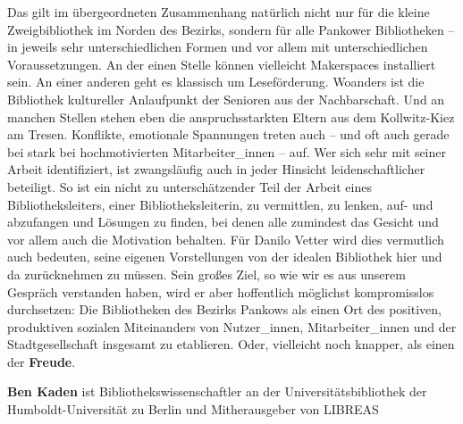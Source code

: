 \documentclass[a4paper,
fontsize=11pt,
oneside,
numbers=noperiodatend,
parskip=half-,
bibliography=totoc,
final
]{scrartcl}
\begin{document}
Das gilt im übergeordneten Zusammenhang natürlich nicht nur für die
kleine Zweigbibliothek im Norden des Bezirks, sondern für alle Pankower
Bibliotheken -- in jeweils sehr unterschiedlichen Formen und vor allem
mit unterschiedlichen Voraussetzungen. An der einen Stelle können
vielleicht Makerspaces installiert sein. An einer anderen geht es
klassisch um Leseförderung. Woanders ist die Bibliothek kultureller
Anlaufpunkt der Senioren aus der Nachbarschaft. Und an manchen Stellen
stehen eben die anspruchsstarkten Eltern aus dem Kollwitz-Kiez am
Tresen. Konflikte, emotionale Spannungen treten auch -- und oft auch
gerade bei stark bei hochmotivierten Mitarbeiter\_innen -- auf. Wer sich
sehr mit seiner Arbeit identifiziert, ist zwangsläufig auch in jeder
Hinsicht leidenschaftlicher beteiligt. So ist ein nicht zu
unterschätzender Teil der Arbeit eines Bibliotheksleiters, einer
Bibliotheksleiterin, zu vermittlen, zu lenken, auf- und abzufangen und
Lösungen zu finden, bei denen alle zumindest das Gesicht und vor allem
auch die Motivation behalten. Für Danilo Vetter wird dies vermutlich
auch bedeuten, seine eigenen Vorstellungen von der idealen Bibliothek
hier und da zurücknehmen zu müssen. Sein großes Ziel, so wie wir es aus
unserem Gespräch verstanden haben, wird er aber hoffentlich möglichst
kompromisslos durchsetzen: Die Bibliotheken des Bezirks Pankows als
einen Ort des positiven, produktiven sozialen Miteinanders von
Nutzer\_innen, Mitarbeiter\_innen und der Stadtgesellschaft insgesamt zu
etablieren. Oder, vielleicht noch knapper, als einen der
\textbf{Freude}.

\textbf{Ben Kaden} ist Bibliothekswissenschaftler an der
Universitätsbibliothek der Humboldt-Universität zu Berlin und
Mitherausgeber von LIBREAS
\end{document}
